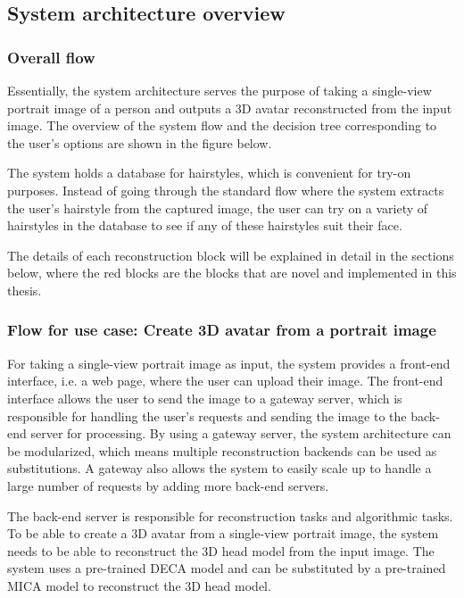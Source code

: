 \subsection{System architecture overview}

\subsubsection{Overall flow}

Essentially, the system architecture serves the purpose of taking a single-view portrait image of a person and outputs a 3D avatar reconstructed from the input image. The overview of the system flow and the decision tree corresponding to the user's options are shown in the figure below.


The system holds a database for hairstyles, which is convenient for try-on purposes. Instead of going through the standard flow where the system extracts the user's hairstyle from the captured image, the user can try on a variety of hairstyles in the database to see if any of these hairstyles suit their face.

The details of each reconstruction block will be explained in detail in the sections below, where the red blocks are the blocks that are novel and implemented in this thesis.

\subsubsection{Flow for use case: Create 3D avatar from a portrait image}
For taking a single-view portrait image as input, the system provides a front-end interface, i.e. a web page, where the user can upload their image. The front-end interface allows the user to send the image to a gateway server, which is responsible for handling the user's requests and sending the image to the back-end server for processing. By using a gateway server, the system architecture can be modularized, which means multiple reconstruction backends can be used as substitutions. A gateway also allows the system to easily scale up to handle a large number of requests by adding more back-end servers.

The back-end server is responsible for reconstruction tasks and algorithmic tasks. To be able to create a 3D avatar from a single-view portrait image, the system needs to be able to reconstruct the 3D head model from the input image. The system uses a pre-trained DECA model and can be substituted by a pre-trained MICA model \cite{fengLearningAnimatableDetailed2021} to reconstruct the 3D head model.

